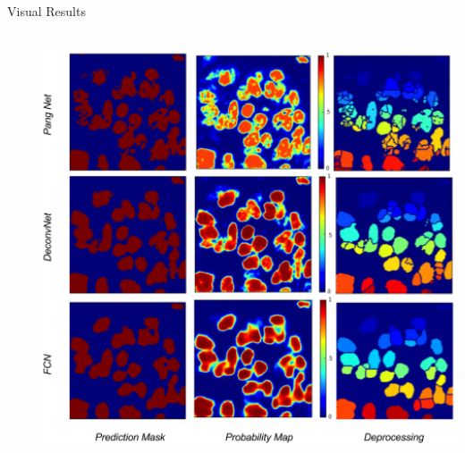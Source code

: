 \documentclass{beamer}
\begin{document}
\begin{frame}{Visual Results}
\begin{columns}
\begin{column}{0.3\textwidth}
\end{column}
\begin{column}{0.7\textwidth}
\includegraphics[width=1.1\textwidth]{ResultVisualise}

\end{column}
\end{columns}
\end{frame}
\end{document}
